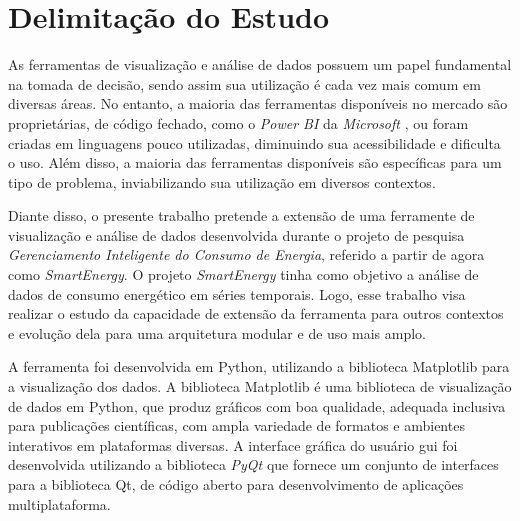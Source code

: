 

\section{Delimitação do Estudo}
    \label{sec:delimitacao-estudo}

    As ferramentas de visualização e análise de dados possuem um papel fundamental na tomada de decisão, sendo assim sua utilização é cada vez mais comum em diversas áreas. No entanto, a maioria das ferramentas disponíveis no mercado são proprietárias, de código fechado, como o \textit{Power BI} da \textit{Microsoft} \cite{power_bi}, ou foram criadas em linguagens pouco utilizadas, diminuindo sua acessibilidade e dificulta o uso. Além disso, a maioria das ferramentas disponíveis são específicas para um tipo de problema, inviabilizando sua utilização em diversos contextos.

    Diante disso, o presente trabalho pretende a extensão de uma ferramente de visualização e análise de dados desenvolvida durante o projeto de pesquisa \textit{Gerenciamento Inteligente do Consumo de Energia}, referido a partir de agora como \textit{SmartEnergy}. O projeto \textit{SmartEnergy} tinha como objetivo a análise de dados de consumo energético em séries temporais. Logo, esse trabalho visa realizar o estudo da capacidade de extensão da ferramenta para outros contextos e evolução dela para uma arquitetura modular e de uso mais amplo.

    A ferramenta foi desenvolvida em Python, utilizando a biblioteca Matplotlib para a visualização dos dados. A biblioteca Matplotlib é uma biblioteca de visualização de dados em Python, que produz gráficos com boa qualidade, adequada inclusiva para publicações científicas, com ampla variedade de formatos e ambientes interativos em plataformas diversas. A interface gráfica do usuário \ac{gui} foi desenvolvida utilizando a biblioteca \textit{PyQt} que fornece um conjunto de interfaces para a biblioteca Qt, de código aberto para desenvolvimento de aplicações multiplataforma.
